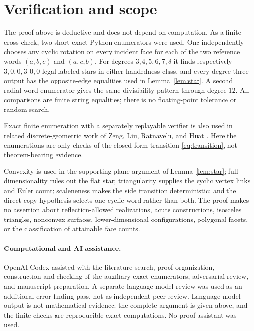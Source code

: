 \documentclass[11pt]{article}
\begin{document}
\section{Verification and scope}

The proof above is deductive and does not depend on computation.  As a finite
cross-check, two short exact Python enumerators were used.  One independently
chooses any cyclic rotation on every incident face for each of the two
reference words $(a,b,c)$ and $(a,c,b)$.  For degrees $3,4,5,6,7,8$ it finds
respectively $3,0,0,3,0,0$ legal labeled stars in either handedness class,
and every degree-three output has the opposite-edge equalities used in
Lemma~\ref{lem:star}.  A second radial-word enumerator gives the same
divisibility pattern through degree $12$.  All comparisons are finite string
equalities; there is no floating-point tolerance or random search.

Exact finite enumeration with a separately replayable verifier is also used
in related discrete-geometric work of Zeng, Liu, Ratnavelu, and Huat
\cite{ZengEtAl2026Certificates}.  Here the enumerations are only checks of the
closed-form transition \eqref{eq:transition}, not theorem-bearing evidence.

Convexity is used in the supporting-plane argument of
Lemma~\ref{lem:star}; full dimensionality rules out the flat star;
triangularity supplies the cyclic vertex links and Euler count; scaleneness
makes the side transition deterministic; and the direct-copy hypothesis
selects one cyclic word rather than both.  The proof makes no assertion about
reflection-allowed realizations, acute constructions, isosceles triangles,
nonconvex surfaces, lower-dimensional configurations, polygonal facets, or
the classification of attainable face counts.

\paragraph{Computational and AI assistance.}
OpenAI Codex assisted with the literature search, proof organization,
construction and checking of the auxiliary exact enumerators, adversarial
review, and manuscript preparation.  A separate language-model review was
used as an additional error-finding pass, not as independent peer review.
Language-model output is not mathematical evidence: the complete argument is
given above, and the finite checks are reproducible exact computations.  No
proof assistant was used.



\end{document}
